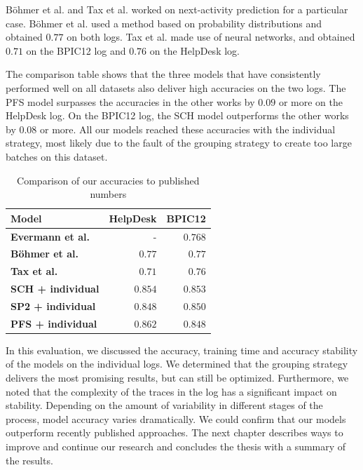 Böhmer et al. and Tax et al. worked on next-activity prediction for a particular case.
Böhmer et al. used a method based on probability distributions and obtained $0.77$ on both logs.
Tax et al. made use of neural networks, and obtained $0.71$ on the BPIC12 log and $0.76$ on the HelpDesk log.

The comparison table shows that the three models that have consistently performed well on all datasets also deliver high accuracies on the two logs.
The PFS model surpasses the accuracies in the other works by $0.09$ or more on the HelpDesk log.
On the BPIC12 log, the SCH model outperforms the other works by $0.08$ or more.
All our models reached these accuracies with the individual strategy, most likely due to the fault of the grouping strategy to create too large batches on this dataset.\\

\begin{table}
\centering
\begin{tabular}{lrr}
\textbf{Model}  &  \textbf{HelpDesk} &  \textbf{BPIC12} \\
\midrule
\textbf{Evermann et al.~\cite{evermann2016}} & - & $0.768$\\
\textbf{Böhmer et al.~\cite{boehmer2018probability}  } & $0.77$ & $0.77$ \\
\textbf{Tax et al.~\cite{tax2017}} & $0.71$ & $0.76$\\
\hline
\textbf{SCH + individual} & $0.854$ & $0.853$ \\
\textbf{SP2 + individual} & $0.848$ & $0.850$ \\
\textbf{PFS + individual} & $0.862$ & $0.848$ \\
\end{tabular}
\caption{Comparison of our accuracies to published numbers}
\label{tab:accuracy-comparison}
\end{table}

In this evaluation, we discussed the accuracy, training time and accuracy stability of the models on the individual logs.
We determined that the grouping strategy delivers the most promising results, but can still be optimized.
Furthermore, we noted that the complexity of the traces in the log has a significant impact on stability.
Depending on the amount of variability in different stages of the process, model accuracy varies dramatically.
We could confirm that our models outperform recently published approaches.
The next chapter describes ways to improve and continue our research and concludes the thesis with a summary of the results.
